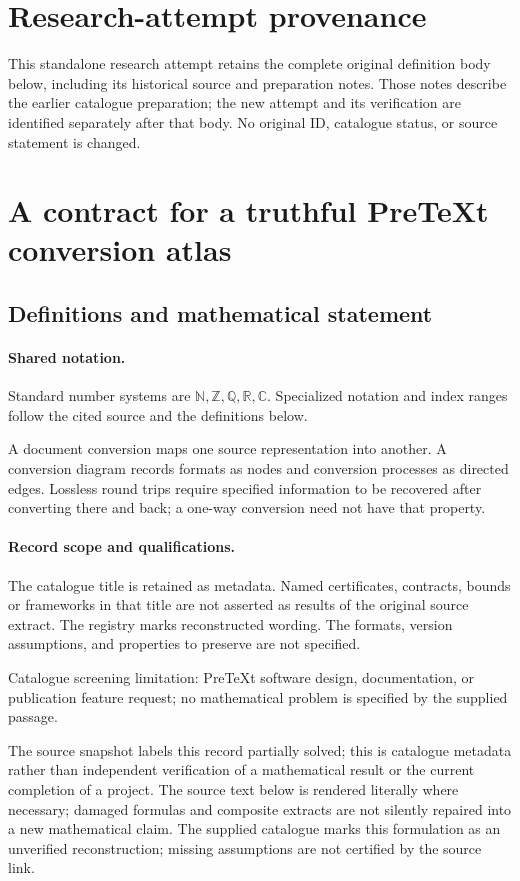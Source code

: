 \documentclass[11pt]{article}
\begin{document}
\section*{Research-attempt provenance}
This standalone research attempt retains the complete original definition body below,
including its historical source and preparation notes. Those notes describe the
earlier catalogue preparation; the new attempt and its verification are identified
separately after that body. No original ID, catalogue status, or source statement is changed.

\section{A contract for a truthful PreTeXt conversion atlas}\label{statement}

\subsection{Definitions and mathematical statement}

\paragraph{Shared notation.}Standard number systems are $\mathbb N,\mathbb Z,\mathbb Q,\mathbb R,\mathbb C$. Specialized notation and index ranges follow the cited source and the definitions below.


A document conversion maps one source representation into another. A conversion diagram records formats as nodes and conversion processes as directed edges. Lossless round trips require specified information to be recovered after converting there and back; a one-way conversion need not have that property.
\paragraph{Record scope and qualifications.}
The catalogue title is retained as metadata. Named certificates, contracts, bounds or frameworks in that title are not asserted as results of the original source extract.
The registry marks reconstructed wording. The formats, version assumptions, and properties to preserve are not specified.

Catalogue screening limitation: PreTeXt software design, documentation, or publication feature request; no mathematical problem is specified by the supplied passage.

The source snapshot labels this record partially solved; this is catalogue metadata rather than independent verification of a mathematical result or the current completion of a project.
The source text below is rendered literally where necessary; damaged formulas and composite extracts are not silently repaired into a new mathematical claim.
The supplied catalogue marks this formulation as an unverified reconstruction; missing assumptions are not certified by the source link.
\end{document}
